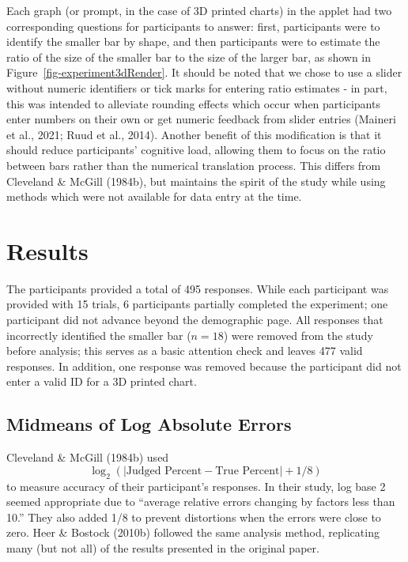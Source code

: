 \documentclass[phd]{nuthesis}
\begin{document}
Each graph (or prompt, in the case of 3D printed charts) in the applet
had two corresponding questions for participants to answer: first,
participants were to identify the smaller bar by shape, and then
participants were to estimate the ratio of the size of the smaller bar
to the size of the larger bar, as shown in
Figure~\ref{fig-experiment3dRender}. It should be noted that we chose to
use a slider without numeric identifiers or tick marks for entering
ratio estimates - in part, this was intended to alleviate rounding
effects which occur when participants enter numbers on their own or get
numeric feedback from slider entries (Maineri et al., 2021; Ruud et al.,
2014). Another benefit of this modification is that it should reduce
participants' cognitive load, allowing them to focus on the ratio
between bars rather than the numerical translation process. This differs
from Cleveland \& McGill (1984b), but maintains the spirit of the study
while using methods which were not available for data entry at the time.

\section{Results}\label{results}

The participants provided a total of 495 responses. While each
participant was provided with 15 trials, 6 participants partially
completed the experiment; one participant did not advance beyond the
demographic page. All responses that incorrectly identified the smaller
bar (\(n = 18\)) were removed from the study before analysis; this
serves as a basic attention check and leaves 477 valid responses. In
addition, one response was removed because the participant did not enter
a valid ID for a 3D printed chart.

\subsection{Midmeans of Log Absolute
Errors}\label{midmeans-of-log-absolute-errors}

Cleveland \& McGill (1984b) used
\[\log_2(|\text{Judged Percent} - \text{True Percent}|+1/8)\] to measure
accuracy of their participant's responses. In their study, log base 2
seemed appropriate due to ``average relative errors changing by factors
less than 10.'' They also added 1/8 to prevent distortions when the
errors were close to zero. Heer \& Bostock (2010b) followed the same
analysis method, replicating many (but not all) of the results presented
in the original paper.
\end{document}
